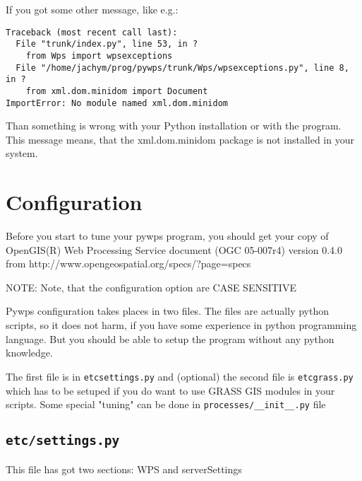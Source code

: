 \documentclass[a4paper,11pt]{article}
\begin{document}
     
    If you got some other message, like e.g.:
     

    \begin{verbatim}
Traceback (most recent call last):
  File "trunk/index.py", line 53, in ?
    from Wps import wpsexceptions
  File "/home/jachym/prog/pywps/trunk/Wps/wpsexceptions.py", line 8, in ?
    from xml.dom.minidom import Document
ImportError: No module named xml.dom.minidom
    \end{verbatim}

     
    Than something is wrong with your Python installation or with the program.
    This message means, that the xml.dom.minidom package is not installed in
    your system.
     


    
    \section{Configuration}
     
    Before you start to tune your pywps program, you should get your copy of
    OpenGIS(R) Web Processing Service document (OGC 05-007r4) version 0.4.0
    from http://www.opengeospatial.org/specs/?page=specs
     

     
    NOTE: Note, that the configuration option are CASE SENSITIVE
     

     
    Pywps configuration takes places in two files. The files are actually python
    scripts, so it does not harm, if you have some experience in python
    programming language. But you should be able to setup the program without
    any python knowledge.
     

     
    The first file is in \texttt{etc\/settings.py} and (optional) the second file is
    \texttt{etc\/grass.py} which has to be setuped if you do want to use
    GRASS GIS modules in your scripts. Some special "tuning" can be done in \texttt{processes/\_\_init\_\_.py}
    file
     


    \subsection{\texttt{etc/settings.py}}
     
    This file has got two sections: WPS and serverSettings
     
\end{document}
